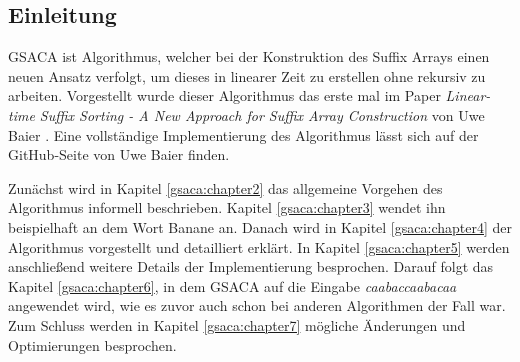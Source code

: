 \subsection{Einleitung}
\label{gsaca:chapter1}
%
GSACA  ist Algorithmus, welcher bei der Konstruktion des Suffix Arrays einen neuen Ansatz verfolgt, um dieses in linearer Zeit zu erstellen ohne rekursiv zu arbeiten.
Vorgestellt wurde dieser Algorithmus das erste mal im Paper \textit{Linear-time Suffix Sorting - A New Approach for Suffix Array Construction} von Uwe Baier \cite{saca:3}. 
Eine vollständige Implementierung des Algorithmus lässt sich auf der GitHub-Seite \cite{saca:3:github} von Uwe Baier finden. \par
Zunächst wird in Kapitel \ref{gsaca:chapter2} das allgemeine Vorgehen des Algorithmus informell beschrieben. 
Kapitel \ref{gsaca:chapter3} wendet ihn beispielhaft an dem Wort Banane an. 
Danach wird in Kapitel \ref{gsaca:chapter4} der Algorithmus vorgestellt und detailliert erklärt. 
In Kapitel \ref{gsaca:chapter5} werden anschließend weitere Details der Implementierung besprochen.
Darauf folgt das Kapitel \ref{gsaca:chapter6}, in dem GSACA auf die Eingabe \textit{caabaccaabacaa} angewendet wird, wie es zuvor auch schon bei anderen Algorithmen der Fall war.
Zum Schluss werden in Kapitel \ref{gsaca:chapter7} mögliche Änderungen und Optimierungen besprochen. 
